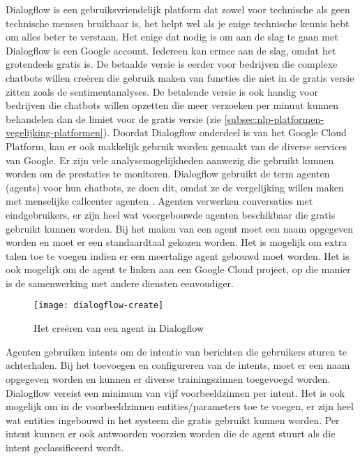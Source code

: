 Dialogflow is een gebruiksvriendelijk platform dat zowel voor technische als geen technische mensen bruikbaar is, het helpt wel als je enige technische kennis hebt om alles beter te verstaan. Het enige dat nodig is om aan de slag te gaan met Dialogflow is een Google account. Iedereen kan ermee aan de slag, omdat het grotendeels gratis is. De betaalde versie is eerder voor bedrijven die complexe chatbots willen creëren die gebruik maken van functies die niet in de gratis versie zitten zoals de sentimentanalyses. De betalende versie is ook handig voor bedrijven die chatbots willen opzetten die meer verzoeken per minuut kunnen behandelen dan de limiet voor de gratis versie (zie \ref{subsec:nlp-platformen-vegelijking-platformen}). Doordat Dialogflow onderdeel is van het Google Cloud Platform, kan er ook makkelijk gebruik worden gemaakt van de diverse services van Google. Er zijn vele analysemogelijkheden aanwezig die gebruikt kunnen worden om de prestaties te monitoren. Dialogflow gebruikt de term agenten (agents) voor hun chatbots, ze doen dit, omdat ze de vergelijking willen maken met menselijke callcenter agenten \autocite{GoogleCloud2020}. Agenten verwerken conversaties met eindgebruikers, er zijn heel wat voorgebouwde agenten beschikbaar die gratis gebruikt kunnen worden. Bij het maken van een agent moet een naam opgegeven worden en moet er een standaardtaal gekozen worden. Het is mogelijk om extra talen toe te voegen indien er een meertalige agent gebouwd moet worden. Het is ook mogelijk om de agent te linken aan een Google Cloud project, op die manier is de samenwerking met andere diensten eenvoudiger. 

\begin{figure}[H]
    \label{fig:dialogflow-create}
    \centering
    \texttt{[image: dialogflow-create]}
    \caption{Het creëren van een agent in Dialogflow}
\end{figure}

Agenten gebruiken intents om de intentie van berichten die gebruikers sturen te achterhalen. Bij het toevoegen en configureren van de intents, moet er een naam opgegeven worden en kunnen er diverse trainingszinnen toegevoegd worden. Dialogflow vereist een minimum van vijf voorbeeldzinnen per intent. Het is ook mogelijk om in de voorbeeldzinnen entities/parameters toe te voegen, er zijn heel wat entities ingebouwd in het systeem die gratis gebruikt kunnen worden. Per intent kunnen er ook antwoorden voorzien worden die de agent stuurt als die intent geclassificeerd wordt.

